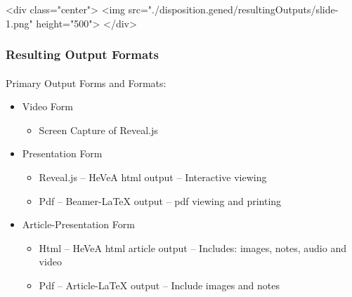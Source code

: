 \begin{whenOrg}
\begin{htmlonly}

\begin{frame}[fragile,plain,label=resultingOutputs]
    \frametitle{}
    \framesubtitle{}
    \begin{rawhtml}
<div class="center">
<img src="./disposition.gened/resultingOutputs/slide-1.png" height="500">
</div>
    \end{rawhtml}
\end{frame}
\end{htmlonly}

\begin{verblatex}

\begin{frame}[fragile,plain,label=resultingOutputs]
    \frametitle{Resulting Output Formats}
    \framesubtitle{}

    Primary Output Forms and Formats:

    \bigskip

    \begin{itemize}
    \item  Video Form
        \begin{itemize}
          \item Screen Capture of Reveal.js
        \end{itemize}
    \item  Presentation Form
        \begin{itemize}
          \item Reveal.js  -- HeVeA html output -- Interactive viewing
          \item Pdf  -- Beamer-LaTeX output -- pdf viewing and printing
        \end{itemize}
    \item  Article-Presentation Form
        \begin{itemize}
          \item Html  -- HeVeA html article output -- Includes: images, notes, audio and video
          \item Pdf  -- Article-LaTeX output -- Include images and notes
        \end{itemize}
    \end{itemize}



\end{frame}
\end{verblatex}
\end{whenOrg}
